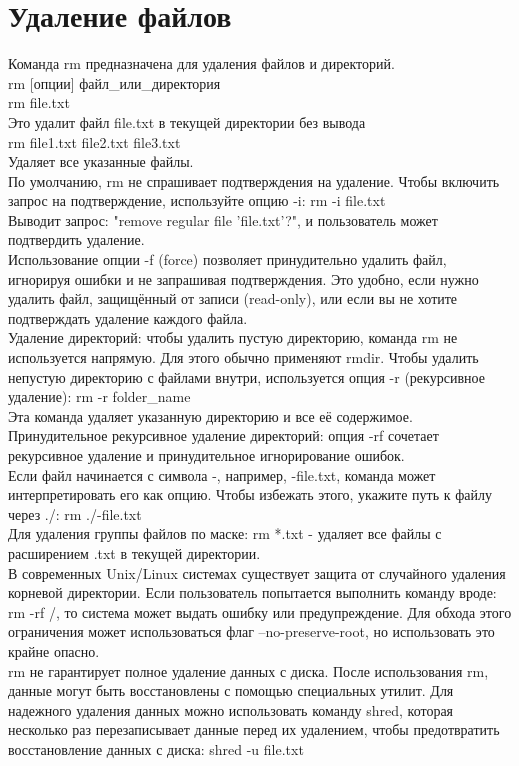 \section{Удаление файлов}
Команда rm предназначена для удаления файлов и директорий. \\
rm [опции] файл\_или\_директория \\
rm file.txt \\
Это удалит файл file.txt в текущей директории без вывода \\
rm file1.txt file2.txt file3.txt \\
Удаляет все указанные файлы. \\
По умолчанию, rm не спрашивает подтверждения на удаление.
Чтобы включить запрос на подтверждение, используйте опцию -i:
rm -i file.txt \\
Выводит запрос: "remove regular file 'file.txt'?", и пользователь может подтвердить удаление. \\
Использование опции -f (force) позволяет принудительно удалить файл, игнорируя ошибки и не запрашивая подтверждения. Это удобно, если нужно удалить файл, защищённый от записи (read-only), или если вы не хотите подтверждать удаление каждого файла. \\
Удаление директорий: чтобы удалить пустую директорию, команда rm не используется напрямую. Для этого обычно применяют rmdir.
Чтобы удалить непустую директорию с файлами внутри, используется опция -r (рекурсивное удаление):
rm -r folder\_name \\
Эта команда удаляет указанную директорию и все её содержимое. \\
Принудительное рекурсивное удаление директорий: опция -rf сочетает рекурсивное удаление и принудительное игнорирование ошибок. \\
Если файл начинается с символа -, например, -file.txt, команда может интерпретировать его как опцию.
Чтобы избежать этого, укажите путь к файлу через ./: rm ./-file.txt \\
Для удаления группы файлов по маске: rm *.txt - удаляет все файлы с расширением .txt в текущей директории. \\
В современных Unix/Linux системах существует защита от случайного удаления корневой директории. Если пользователь попытается выполнить команду вроде: rm -rf /, то 
система может выдать ошибку или предупреждение. Для обхода этого ограничения может использоваться флаг --no-preserve-root, но использовать это крайне опасно. \\
rm не гарантирует полное удаление данных с диска. После использования rm, данные могут быть восстановлены с помощью специальных утилит. Для надежного удаления данных можно использовать команду shred, которая несколько раз перезаписывает данные перед их удалением, чтобы предотвратить восстановление данных с диска: shred -u file.txt \\
